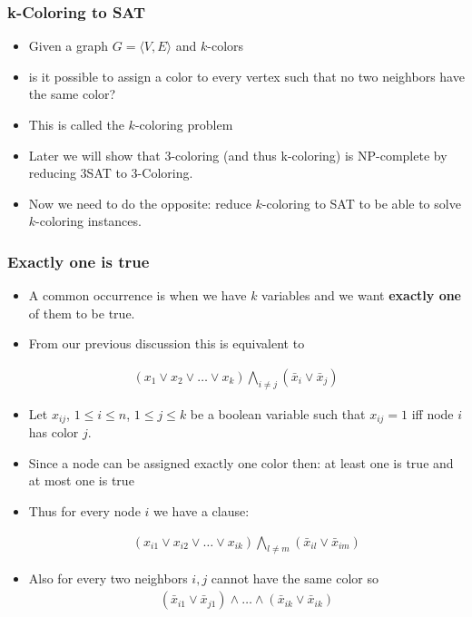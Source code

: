 \documentclass{beamer}
\begin{document}
\begin{frame}
  \frametitle{k-Coloring to SAT}
  \begin{itemize}
  \item Given a graph $G=\langle V,E\rangle$ and $k$-colors 
  \item is it possible to assign a color to every vertex such that no
    two neighbors have the same color?
  \item This is called the $k$-coloring problem
  \item Later we will show that 3-coloring (and thus k-coloring)  is
    NP-complete by reducing 3SAT to 3-Coloring.
  \item Now we need to do the opposite: reduce $k$-coloring to SAT to
    be able to solve $k$-coloring instances.
  \end{itemize}
\end{frame}
\begin{frame}
  \frametitle{Exactly one is true}
  \begin{itemize}
  \item A common occurrence is when we have $k$ variables and we want
   \textbf{ exactly one } of them to be true.
  \item From our previous discussion this is equivalent to 
  \end{itemize}
  \begin{align*}
    (x_1\vee x_2\vee\ldots \vee x_k)\bigwedge_{i\ne j} (\bar{x}_{i}\vee \bar{x}_j)
  \end{align*}
\end{frame}
\begin{frame}
  \begin{itemize}
  \item Let $x_{ij}$, $1\le i\le n$, $1\le j\le k$ be a boolean
    variable such that $x_{ij}=1$ iff node $i$ has color $j$.
  \item Since a node can be assigned exactly one color then: at least
    one is true and at most one is true
  \item Thus for every node $i$ we have a clause:

  \begin{align*}
    (x_{i1}\vee x_{i2}\vee\ldots \vee x_{ik})\bigwedge_{l\ne m} (\bar{x}_{il}\vee \bar{x}_{im})
  \end{align*}
\item Also for every two neighbors $i,j$ cannot have the same color so
  \begin{align*}
    (\bar{x}_{i1}\vee \bar{x}_{j1})\wedge\ldots \wedge (\bar{x}_{ik}\vee \bar{x}_{ik})
  \end{align*}
  \end{itemize} 
\end{frame}
\end{document}
